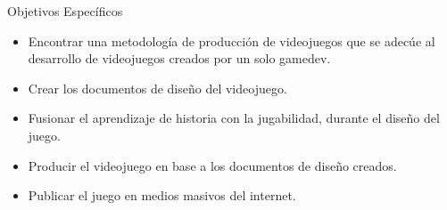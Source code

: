 \begin{section}{Objetivos Específicos}
  \begin{itemize}
    \item Encontrar una metodología de producción de videojuegos que se adecúe al desarrollo de videojuegos creados por un solo gamedev. 

    \item Crear los documentos de diseño del videojuego. 

    \item Fusionar el aprendizaje de historia con la jugabilidad, durante el diseño del juego. 
      
    \item Producir el videojuego en base a los documentos de diseño creados. 

    \item Publicar el juego en medios masivos del internet.

  \end{itemize}
\end{section}
